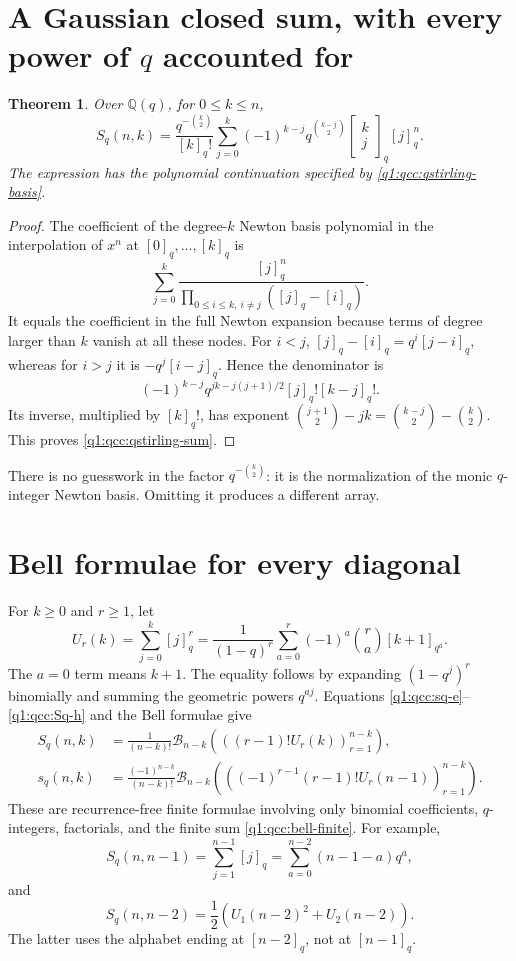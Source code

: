 \documentclass[11pt,a4paper,oneside,openany]{book}
\newtheorem{theorem}{Theorem}[chapter]
\theoremstyle{definition}
\theoremstyle{remark}
\newcommand{\Q}{\mathbb Q}
\newcommand{\GB}[3][q]{\begin{bmatrix}#2\\#3\end{bmatrix}_{#1}}
\newcommand{\Y}[1]{\mathcal B_{#1}}
\newcommand{\qbname}{\texorpdfstring{$q$}{q}}
\begin{document}
\section{A Gaussian closed sum, with every power of \qbname{} accounted for}
\begin{theorem}\label{q1:qcc:qstirling-explicit}
Over \(\Q(q)\), for \(0\le k\le n\),
\begin{equation}\label{q1:qcc:qstirling-sum}
 S_q(n,k)=\frac{q^{-\binom k2}}{[k]_q!}
 \sum_{j=0}^k(-1)^{k-j}q^{\binom{k-j}{2}}\GB kj[j]_q^n.
\end{equation}
The expression has the polynomial continuation specified by
\eqref{q1:qcc:qstirling-basis}.
\end{theorem}
\begin{proof}
The coefficient of the degree-\(k\) Newton basis polynomial in the interpolation
of \(x^n\) at \([0]_q,\ldots,[k]_q\) is
\[
 \sum_{j=0}^k\frac{[j]_q^n}{\prod_{0\le i\le k,\ i\ne j}([j]_q-[i]_q)}.
\]
It equals the coefficient in the full Newton expansion because terms of degree
larger than \(k\) vanish at all these nodes. For \(i<j\),
\([j]_q-[i]_q=q^i[j-i]_q\), whereas for \(i>j\) it is
\(-q^j[i-j]_q\). Hence the denominator is
\[
 (-1)^{k-j}q^{jk-j(j+1)/2}[j]_q![k-j]_q!.
\]
Its inverse, multiplied by \([k]_q!\), has exponent
\(\binom{j+1}{2}-jk=\binom{k-j}{2}-\binom k2\).
This proves \eqref{q1:qcc:qstirling-sum}.
\end{proof}
There is no guesswork in the factor \(q^{-\binom k2}\): it is the normalization
of the monic \(q\)-integer Newton basis. Omitting it produces a different array.

\section{Bell formulae for every diagonal}
For \(k\ge0\) and \(r\ge1\), let
\begin{equation}\label{q1:qcc:qinteger-powersum}
 U_r(k)=\sum_{j=0}^k[j]_q^r
 =\frac1{(1-q)^r}\sum_{a=0}^r(-1)^a\binom ra[k+1]_{q^a}.
\end{equation}
The \(a=0\) term means \(k+1\). The equality follows by expanding
\((1-q^j)^r\) binomially and summing the geometric powers \(q^{aj}\).
Equations \eqref{q1:qcc:sq-e}--\eqref{q1:qcc:Sq-h} and the Bell formulae give
\begin{align}
 S_q(n,k)&=\frac1{(n-k)!}\Y{n-k}
   \left(\left((r-1)!U_r(k)\right)_{r=1}^{n-k}\right),\label{q1:qcc:Sq-bell}\\
 s_q(n,k)&=\frac{(-1)^{n-k}}{(n-k)!}\Y{n-k}
   \left(\left((-1)^{r-1}(r-1)!U_r(n-1)\right)_{r=1}^{n-k}\right).
 \label{q1:qcc:sq-bell}
\end{align}
These are recurrence-free finite formulae involving only binomial coefficients,
\(q\)-integers, factorials, and the finite sum \eqref{q1:qcc:bell-finite}.
For example,
\[
 S_q(n,n-1)=\sum_{j=1}^{n-1}[j]_q
          =\sum_{a=0}^{n-2}(n-1-a)q^a,
\]
and
\[
 S_q(n,n-2)=\frac12\left(U_1(n-2)^2+U_2(n-2)\right).
\]
The latter uses the alphabet ending at \([n-2]_q\), not at \([n-1]_q\).
\end{document}
